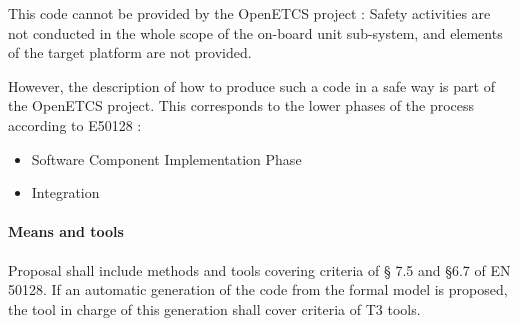 This code cannot be provided by the OpenETCS project : Safety  activities are not conducted in the whole scope of the on-board unit sub-system, and elements of the target platform are not provided.

However, the description of how to  produce such a code in a safe way is part of the OpenETCS project. This corresponds to the lower phases of the process according to  E50128 :
\begin{itemize}
\item Software Component Implementation Phase
\item Integration
\end{itemize}


\paragraph{Means and tools}
\label{sec:code-means}

Proposal shall include methods and tools covering criteria of § 7.5 and §6.7 of EN 50128.
If an automatic generation of the code from the formal model is proposed, the tool in charge of this generation shall cover criteria of T3 tools.




